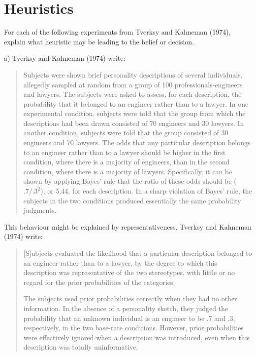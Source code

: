 \documentclass[
  letterpaper,
  DIV=11,
  numbers=noendperiod]{scrreprt}
\begin{document}
\hypertarget{heuristics-1}{%
\section{Heuristics}\label{heuristics-1}}

For each of the following experiments from Tverksy and Kahneman (1974),
explain what heuristic may be leading to the belief or decision.

a) Tverksy and Kahneman (1974) write:

\begin{quote}
Subjects were shown brief personality descriptions of several
individuals, allegedly sampled at random from a group of 100
professionals-engineers and lawyers. The subjects were askcd to assess,
for each description, the probability that it belonged to an engineer
rather than to a lawyer. In one experimental condition, subjects were
told that the group from which the descriptions had been drawn consisted
of 70 engineers and 30 lawyers. In another condition, subjects were told
that the group consisted of 30 engineers and 70 lawyers. The odds that
any particular description belongs to an engineer rather than to a
lawyer should be higher in the first condition, where there is a
majority of engineers, than in the second condition, where there is a
majority of lawyers. Specifically, it can be shown by applying Bayes'
rule that the ratio of these odds should be (\(.7/.3^2\)), or 5.44, for
each description. In a sharp violation of Bayes' rule, the subjects in
the two conditions produced essentially the same probability judgments.
\end{quote}

\begin{tcolorbox}[enhanced jigsaw, title=\textcolor{quarto-callout-tip-color}{\faLightbulb}\hspace{0.5em}{Answer}, toprule=.15mm, colback=white, breakable, titlerule=0mm, colframe=quarto-callout-tip-color-frame, coltitle=black, opacityback=0, rightrule=.15mm, colbacktitle=quarto-callout-tip-color!10!white, bottomtitle=1mm, opacitybacktitle=0.6, arc=.35mm, bottomrule=.15mm, toptitle=1mm, leftrule=.75mm, left=2mm]

This behaviour might be explained by representativeness. Tverksy and
Kahneman (1974) write:

\begin{quote}
{[}S{]}ubjects evaluated the likelihood that a particular description
belonged to an engineer rather than to a lawyer, by the degree to which
this description was representative of the two stereotypes, with little
or no regard for the prior probabilities of the categories.

The subjects used prior probabilities correctly when they had no other
information. In the absence of a personality sketch, they judged the
probability that an unknown individual is an engineer to be .7 and .3,
respectively, in the two base-rate conditions. However, prior
probabilities were effectively ignored when a description was
introduced, even when this description was totally uninformative.
\end{quote}

\end{tcolorbox}
\end{document}
